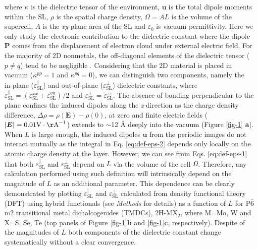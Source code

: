 \documentclass[journal=ancac3,manuscript=article,email=true,hyperref=true,keywords=false]{achemso}
\begin{document}
where $\kappa$ is the dielectric tensor of the environment,
$\boldsymbol{u}$ is the total dipole moments within the SL, $\rho$ is
the spatial charge density, $\Omega=AL$ is the volume of the
supercell, $A$ is the \textit{xy}-plane area of the SL and
$\varepsilon_{0}$ is vacuum permittivity. Here we only study the
electronic contribution to the dielectric constant where the dipole
$\boldsymbol{P}$ comes from the displacement of electron cloud under
external electric field. For the majority of 2D nonmetals, the
off-diagonal elements of the dielectric tensor ($p \neq q$) tend to be
negligible .  Considering that the 2D material is placed in vacuum
($\kappa^{pp} = 1$ and $\kappa^{pq} = 0$), we can distinguish two
components, namely the in-plane
($\varepsilon_{\mathrm{SL}}^{\parallel}$) and out-of-plane
($\varepsilon_{\mathrm{SL}}^{\perp}$) dielectric constants, where
$\varepsilon_{\mathrm{SL}}^{\parallel} =
(\varepsilon_{\mathrm{SL}}^{xx} + \varepsilon_{\mathrm{SL}}^{yy})/2$
and
$\varepsilon_{\mathrm{SL}}^{\perp} = \varepsilon_{\mathrm{SL}}^{zz}$.
The absence of bonding perpendicular to the plane confines the induced
dipoles along the \textit{z}-direction as the charge density
difference, $\Delta \rho=\rho(\boldsymbol{E}) - \rho(0)$, at zero and
finite electric fields
($|\boldsymbol{E}_{}|=0.01 \mathrm{V\cdot \AA}^{-1}$) extends to
$\sim{}$12 \AA{} deeply into the vacuum (Figure \ref{fig-1}{\bf
  a}). When $L$ is large enough, the induced dipoles $\boldsymbol{u}$
from the periodic images do not interact mutually as the integral in
Eq. \ref{eq:def-eps-2} depends only locally on the atomic charge
density at the layer.  However, we can see from
Eqs. \ref{eq:def-eps-1} that both
$\varepsilon^{\parallel}_{\mathrm{SL}}$ and
$\varepsilon^{\perp}_{\mathrm{SL}}$ depend on $L$ via the volume of
the cell $\Omega$.  Therefore, any calculation performed using such
definition will intrinsically depend on the magnitude of $L$ as an
additional parameter.  This dependence can be clearly demonstrated by
plotting $\varepsilon^{\parallel}_{\mathrm{SL}}$ and
$\varepsilon^{\perp}_{\mathrm{SL}}$ calculated from density functional
theory (DFT) using hybrid functionals (see {\it Methods} for details)
as a function of $L$ for P$\bar{6}$m2 transitional metal
dichalcogenides (TMDCs), 2H-MX$_{2}$, where M=Mo, W and X=S, Se, Te
(top panels of Figure \ref{fig-1}{\bf b} and \ref{fig-1}{\bf c},
respectively).  Despite of the magnitudes of $L$ both components of
the dielectric constant change systematically without a clear
convergence.
\end{document}
